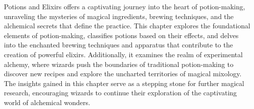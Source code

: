 Potions and Elixirs offers a captivating journey into the heart of potion-making, unraveling the mysteries of magical ingredients, brewing techniques, and the alchemical secrets that define the practice. This chapter explores the foundational elements of potion-making, classifies potions based on their effects, and delves into the enchanted brewing techniques and apparatus that contribute to the creation of powerful elixirs. Additionally, it examines the realm of experimental alchemy, where wizards push the boundaries of traditional potion-making to discover new recipes and explore the uncharted territories of magical mixology. The insights gained in this chapter serve as a stepping stone for further magical research, encouraging wizards to continue their exploration of the captivating world of alchemical wonders.